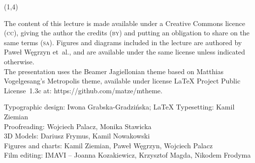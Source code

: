 {\begin{frame}[standout]
\begin{textblock}{4.2}
    \end{textblock}





    \begin{textblock}{11}(1,4)

      \begin{flushleft}

        \mdseries

        \footnotesize

        \RaggedRight

        \color{jFrametitleFGColor}

        The content of this lecture is made available under a Creative
        Commons licence (\textsc{cc}), giving the author the credits
        (\textsc{by}) and putting an obligation to share on the same terms
        (\textsc{sa}). Figures and diagrams included in the lecture are
        authored by Paweł Węgrzyn et~al., and are available under the same
        license unless indicated otherwise.\\ The presentation uses the
        Beamer Jagiellonian theme based on Matthias Vogelgesang’s
        Metropolis theme, available under license \LaTeX{} Project
        Public License~1.3c at: 
        {https://github.com/matze/mtheme}.

        Typographic design: Iwona Grabska-Gradzińska;
        \LaTeX{} Typesetting: Kamil Ziemian \\
        Proofreading: Wojciech Palacz,
        Monika Stawicka \\
        3D Models: Dariusz Frymus, Kamil Nowakowski \\
        Figures and charts: Kamil Ziemian, Paweł Węgrzyn,
        Wojciech Palacz \\
        Film editing: IMAVI -- Joanna Kozakiewicz, Krzysztof Magda, Nikodem
        Frodyma

      \end{flushleft}

    \end{textblock}

  \end{frame}





  \begin{frame}[standout]


    \begingroup

    \color{jFrametitleFGColor}

    #1

    \endgroup

  \end{frame}
}



